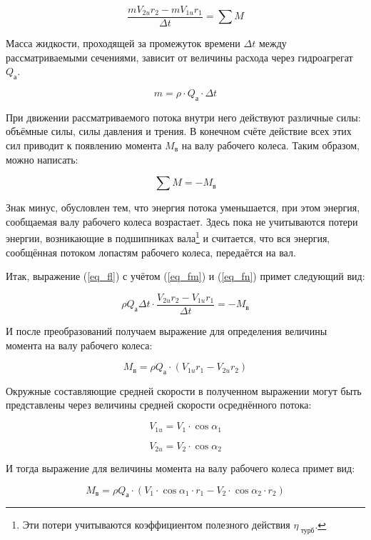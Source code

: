 \begin{equation}
\label{eq_fl}
   \frac{m V_{2u} r_2 - m V_{1u} r_1}{\Delta t} = \sum M
\end{equation}

Масса жидкости, проходящей за промежуток времени $ \Delta t $ между рассматриваемыми сечениями, зависит от величины расхода через гидроагрегат $ Q_{\text{а}} $.

\begin{equation}
\label{eq_fm}
   m = \rho \cdot Q_{\text{а}} \cdot \Delta t
\end{equation}

При движении рассматриваемого потока внутри него действуют различные силы: объёмные силы, силы давления и трения. В конечном счёте действие всех этих сил приводит к появлению момента $ M_{\text{в}} $ на валу рабочего колеса. Таким образом, можно написать:

\begin{equation}
\label{eq_fn}
   \sum M = - M_{\text{в}}
\end{equation}

Знак минус, обусловлен тем, что энергия потока уменьшается, при этом энергия, сообщаемая валу рабочего колеса возрастает. Здесь пока не учитываются потери энергии, возникающие в подшипниках вала\footnote{Эти потери учитываются коэффициентом полезного действия $ \eta_{\text{ турб}} $.} и считается, что вся энергия, сообщённая потоком лопастям рабочего колеса, передаётся на вал.

Итак, выражение (\ref{eq_fl}) с учётом (\ref{eq_fm}) и (\ref{eq_fn}) примет следующий вид:

$$
   \rho  Q_{\text{а}} \Delta t \cdot \frac{V_{2u} r_2 - V_{1u} r_1}{\Delta t} = - M_{\text{в}}
$$

И после преобразований получаем выражение для определения величины момента на валу рабочего колеса:

$$
   M_{\text{в}} = \rho  Q_{\text{а}} \cdot ( V_{1u} r_1 - V_{2u} r_2 )
$$

Окружные составляющие средней скорости в полученном выражении могут быть представлены через величины средней скорости осреднённого потока:

$$
   V_{1u} = V_1 \cdot \cos \alpha_1
$$

$$
   V_{2u} = V_2 \cdot \cos \alpha_2
$$

И тогда выражение для величины момента на валу рабочего колеса примет вид:

\begin{equation}
\label{eq_fn2}
    M_{\text{в}} = \rho  Q_{\text{а}} \cdot ( V_1 \cdot \cos \alpha_1 \cdot r_1 - V_2 \cdot \cos \alpha_2 \cdot r_2 ) 
\end{equation}

